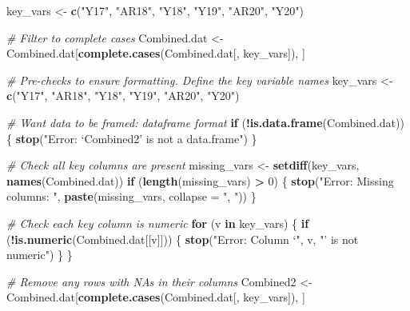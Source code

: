 \documentclass[
]{article}
\newenvironment{Shaded}{\begin{snugshade}}{\end{snugshade}}
\newcommand{\AttributeTok}[1]{\textcolor[rgb]{0.13,0.29,0.53}{#1}}
\newcommand{\CommentTok}[1]{\textcolor[rgb]{0.56,0.35,0.01}{\textit{#1}}}
\newcommand{\ControlFlowTok}[1]{\textcolor[rgb]{0.13,0.29,0.53}{\textbf{#1}}}
\newcommand{\DecValTok}[1]{\textcolor[rgb]{0.00,0.00,0.81}{#1}}
\newcommand{\FunctionTok}[1]{\textcolor[rgb]{0.13,0.29,0.53}{\textbf{#1}}}
\newcommand{\NormalTok}[1]{#1}
\newcommand{\OtherTok}[1]{\textcolor[rgb]{0.56,0.35,0.01}{#1}}
\newcommand{\SpecialCharTok}[1]{\textcolor[rgb]{0.81,0.36,0.00}{\textbf{#1}}}
\newcommand{\StringTok}[1]{\textcolor[rgb]{0.31,0.60,0.02}{#1}}
\begin{document}
\begin{Shaded}
\begin{Highlighting}[]
\NormalTok{key\_vars }\OtherTok{\textless{}{-}} \FunctionTok{c}\NormalTok{(}\StringTok{"Y17"}\NormalTok{, }\StringTok{"AR18"}\NormalTok{, }\StringTok{"Y18"}\NormalTok{, }\StringTok{"Y19"}\NormalTok{, }\StringTok{"AR20"}\NormalTok{, }\StringTok{"Y20"}\NormalTok{)}

\CommentTok{\# Filter to complete cases}
\NormalTok{Combined.dat }\OtherTok{\textless{}{-}}\NormalTok{ Combined.dat[}\FunctionTok{complete.cases}\NormalTok{(Combined.dat[, key\_vars]), ]}

\CommentTok{\# Pre{-}checks to ensure formatting.  Define the key variable names}
\NormalTok{key\_vars }\OtherTok{\textless{}{-}} \FunctionTok{c}\NormalTok{(}\StringTok{"Y17"}\NormalTok{, }\StringTok{"AR18"}\NormalTok{, }\StringTok{"Y18"}\NormalTok{, }\StringTok{"Y19"}\NormalTok{, }\StringTok{"AR20"}\NormalTok{, }\StringTok{"Y20"}\NormalTok{)}

\CommentTok{\# Want data to be framed: dataframe format }
\ControlFlowTok{if}\NormalTok{ (}\SpecialCharTok{!}\FunctionTok{is.data.frame}\NormalTok{(Combined.dat)) \{}
  \FunctionTok{stop}\NormalTok{(}\StringTok{"Error: ‘Combined2’ is not a data.frame"}\NormalTok{)}
\NormalTok{\}}

\CommentTok{\# Check all key columns are present}
\NormalTok{missing\_vars }\OtherTok{\textless{}{-}} \FunctionTok{setdiff}\NormalTok{(key\_vars, }\FunctionTok{names}\NormalTok{(Combined.dat))}
\ControlFlowTok{if}\NormalTok{ (}\FunctionTok{length}\NormalTok{(missing\_vars) }\SpecialCharTok{\textgreater{}} \DecValTok{0}\NormalTok{) \{}
  \FunctionTok{stop}\NormalTok{(}\StringTok{"Error: Missing columns: "}\NormalTok{, }\FunctionTok{paste}\NormalTok{(missing\_vars, }\AttributeTok{collapse =} \StringTok{", "}\NormalTok{))}
\NormalTok{\}}

\CommentTok{\# Check each key column is numeric}
\ControlFlowTok{for}\NormalTok{ (v }\ControlFlowTok{in}\NormalTok{ key\_vars) \{}
  \ControlFlowTok{if}\NormalTok{ (}\SpecialCharTok{!}\FunctionTok{is.numeric}\NormalTok{(Combined.dat[[v]])) \{}
    \FunctionTok{stop}\NormalTok{(}\StringTok{"Error: Column ‘"}\NormalTok{, v, }\StringTok{"’ is not numeric"}\NormalTok{)}
\NormalTok{  \}}
\NormalTok{\}}

\CommentTok{\# Remove any rows with NAs in their columns}
\NormalTok{Combined2 }\OtherTok{\textless{}{-}}\NormalTok{ Combined.dat[}\FunctionTok{complete.cases}\NormalTok{(Combined.dat[, key\_vars]), ]}
\end{Highlighting}
\end{Shaded}
\end{document}
